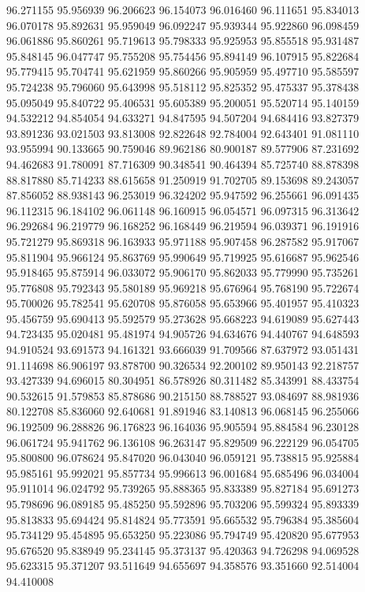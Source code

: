 96.271155
95.956939
96.206623
96.154073
96.016460
96.111651
95.834013
96.070178
95.892631
95.959049
96.092247
95.939344
95.922860
96.098459
96.061886
95.860261
95.719613
95.798333
95.925953
95.855518
95.931487
95.848145
96.047747
95.755208
95.754456
95.894149
96.107915
95.822684
95.779415
95.704741
95.621959
95.860266
95.905959
95.497710
95.585597
95.724238
95.796060
95.643998
95.518112
95.825352
95.475337
95.378438
95.095049
95.840722
95.406531
95.605389
95.200051
95.520714
95.140159
94.532212
94.854054
94.633271
94.847595
94.507204
94.684416
93.827379
93.891236
93.021503
93.813008
92.822648
92.784004
92.643401
91.081110
93.955994
90.133665
90.759046
89.962186
80.900187
89.577906
87.231692
94.462683
91.780091
87.716309
90.348541
90.464394
85.725740
88.878398
88.817880
85.714233
88.615658
91.250919
91.702705
89.153698
89.243057
87.856052
88.938143
96.253019
96.324202
95.947592
96.255661
96.091435
96.112315
96.184102
96.061148
96.160915
96.054571
96.097315
96.313642
96.292684
96.219779
96.168252
96.168449
96.219594
96.039371
96.191916
95.721279
95.869318
96.163933
95.971188
95.907458
96.287582
95.917067
95.811904
95.966124
95.863769
95.990649
95.719925
95.616687
95.962546
95.918465
95.875914
96.033072
95.906170
95.862033
95.779990
95.735261
95.776808
95.792343
95.580189
95.969218
95.676964
95.768190
95.722674
95.700026
95.782541
95.620708
95.876058
95.653966
95.401957
95.410323
95.456759
95.690413
95.592579
95.273628
95.668223
94.619089
95.627443
94.723435
95.020481
95.481974
94.905726
94.634676
94.440767
94.648593
94.910524
93.691573
94.161321
93.666039
91.709566
87.637972
93.051431
91.114698
86.906197
93.878700
90.326534
92.200102
89.950143
92.218757
93.427339
94.696015
80.304951
86.578926
80.311482
85.343991
88.433754
90.532615
91.579853
85.878686
90.215150
88.788527
93.084697
88.981936
80.122708
85.836060
92.640681
91.891946
83.140813
96.068145
96.255066
96.192509
96.288826
96.176823
96.164036
95.905594
95.884584
96.230128
96.061724
95.941762
96.136108
96.263147
95.829509
96.222129
96.054705
95.800800
96.078624
95.847020
96.043040
96.059121
95.738815
95.925884
95.985161
95.992021
95.857734
95.996613
96.001684
95.685496
96.034004
95.911014
96.024792
95.739265
95.888365
95.833389
95.827184
95.691273
95.798696
96.089185
95.485250
95.592896
95.703206
95.599324
95.893339
95.813833
95.694424
95.814824
95.773591
95.665532
95.796384
95.385604
95.734129
95.454895
95.653250
95.223086
95.794749
95.420820
95.677953
95.676520
95.838949
95.234145
95.373137
95.420363
94.726298
94.069528
95.623315
95.371207
93.511649
94.655697
94.358576
93.351660
92.514004
94.410008
